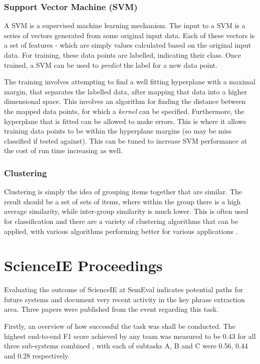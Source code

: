 \subsubsection*{Support Vector Machine (SVM)}
A SVM is a supervised machine learning mechanism. The input to a SVM is a series of vectors generated from some original input data. Each of these vectors is a set of features - which are simply values calculated based on the original input data. For training, these data points are labelled, indicating their class. Once trained, a SVM can be used to \textit{predict} the label for a new data point.

The training involves attempting to find a well fitting hyperplane with a maximal margin, that separates the labelled data, after mapping that data into a higher dimensional space. This involves an algorithm for finding the distance between the mapped data points, for which a \textit{kernel} can be specified. Furthermore, the hyperplane that is fitted can be allowed to make errors. This is where it allows training data points to be within the hyperplane margins (so may be miss classified if tested against). This can be tuned to increase SVM performance at the cost of run time increasing as well.

\subsubsection*{Clustering}
Clustering is simply the idea of grouping items together that are similar. The result should be a set of sets of items, where within the group there is a high average similarity, while inter-group similarity is much lower. This is often used for classification and there are a variety of clustering algorithms that can be applied, with various algorithms performing better for various applications \cite{Rai2010}.

\section{ScienceIE Proceedings}
Evaluating the outcome of ScienceIE at SemEval indicates potential paths for future systems and document very recent activity in the key phrase extraction area. Three papers were published from the event regarding this task.

Firstly, an overview of how successful the task was shall be conducted. The highest end-to-end F1 score achieved by any team was measured to be 0.43 for all three sub-systems combined \cite{Augenstein2017}, with each of subtasks A, B and C were 0.56, 0.44 and 0.28 respectively. 

